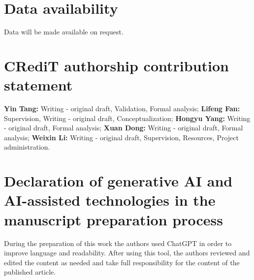 \documentclass[times,review,10pt]{elsarticle}
\begin{document}









\section*{Data availability}
Data will be made available on request.

\section*{CRediT authorship contribution statement}
\textbf{Yin Tang:} Writing - original draft, Validation, Formal analysis; \textbf{Lifeng Fan:} Supervision, Writing - original draft, Conceptualization; \textbf{Hongyu Yang:} Writing - original draft, Formal analysis; \textbf{Xuan Dong:} Writing - original draft, Formal analysis; \textbf{Weixin Li:} Writing - original draft, Supervision, Resources, Project administration.


\section*{Declaration of generative AI and AI-assisted technologies in the manuscript preparation process}
During the preparation of this work the authors used ChatGPT in order to improve language and readability. After using this tool, the authors reviewed and edited the content as needed and take full responsibility for the content of the published article.
















\end{document}
